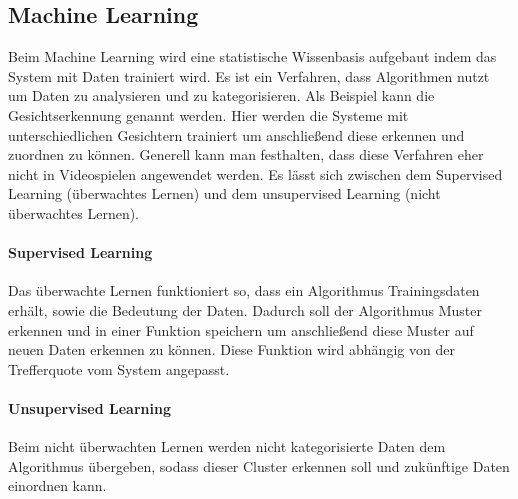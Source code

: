 \subsection{Machine Learning}
\label{ch:Grundlagen:sec:Learning}
Beim Machine Learning wird eine statistische Wissenbasis aufgebaut indem das System mit Daten trainiert wird. Es ist ein Verfahren, dass Algorithmen nutzt um Daten zu analysieren und zu kategorisieren. Als Beispiel kann die Gesichtserkennung genannt werden. Hier werden die Systeme mit unterschiedlichen Gesichtern trainiert um anschließend diese erkennen und zuordnen zu können. Generell kann man festhalten, dass diese Verfahren eher nicht in Videospielen angewendet werden. Es lässt sich zwischen dem Supervised Learning (überwachtes Lernen) und dem unsupervised Learning (nicht überwachtes Lernen).
\paragraph{Supervised Learning}
Das überwachte Lernen funktioniert so, dass ein Algorithmus Trainingsdaten erhält, sowie die Bedeutung der Daten. Dadurch soll der Algorithmus Muster erkennen und in einer Funktion speichern um anschließend diese Muster auf neuen Daten erkennen zu können. Diese Funktion wird abhängig von der Trefferquote vom System angepasst.
\paragraph{Unsupervised Learning}
Beim nicht überwachten Lernen werden nicht kategorisierte Daten dem Algorithmus übergeben, sodass dieser Cluster erkennen soll und zukünftige Daten einordnen kann.\\





